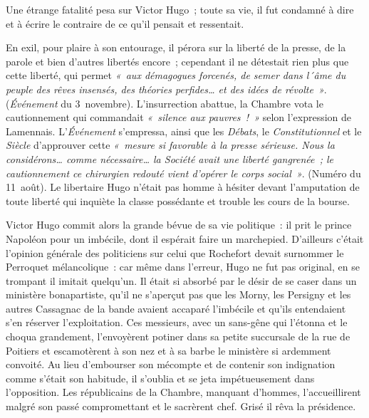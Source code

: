 \documentclass[french,twoside]{book} %
\begin{document}
Une étrange fatalité pesa sur Victor Hugo ; toute sa vie, il fut condamné à dire et à écrire le contraire de ce qu’il pensait et ressentait.\par
En exil, pour plaire à son entourage, il pérora sur la liberté de la presse, de la parole et bien d’autres  
\label{p32}libertés encore ; cependant il ne détestait rien plus que cette liberté, qui permet \emph{« aux démagogues forcenés, de semer dans l´âme du peuple des rêves insensés, des théories perfides… et des idées de révolte »}. (\emph{Événement} du 3 novembre). L’insurrection abattue, la Chambre vota le cautionnement qui commandait \emph{« silence aux pauvres ! »} selon l’expression de Lamennais. L’\emph{Événement} s’empressa, ainsi que les \emph{Débats}, le \emph{Constitutionnel} et le \emph{Siècle} d’approuver cette \emph{« mesure si favorable à la presse sérieuse. Nous la considérons… comme nécessaire… la Société avait une liberté gangrenée ; le cautionnement ce chirurgien redouté vient d’opérer le corps social »}. (Numéro du 11 août). Le libertaire Hugo n’était pas homme à hésiter devant l’amputation de toute liberté qui inquiète la classe possédante et trouble les cours de la bourse.\par
Victor Hugo commit alors la grande bévue de sa vie politique : il prit le prince Napoléon pour un imbécile, dont il espérait faire un marchepied. D’ailleurs c’était l’opinion générale des politiciens sur celui que Rochefort devait surnommer le Perroquet mélancolique : car même dans l’erreur, Hugo ne fut pas original, en se trompant il imitait quelqu’un. Il était si absorbé par le désir de se caser dans un ministère bonapartiste, qu’il ne s’aperçut pas que les Morny, les Persigny et les autres Cassagnac de la bande avaient accaparé l’imbécile et qu’ils entendaient s’en réserver l’exploitation. Ces messieurs, avec un sans-gêne qui l’étonna et le choqua grandement, l’envoyèrent potiner dans sa petite succursale de la rue de Poitiers et escamotèrent à son nez et à  
\label{p33}sa barbe le ministère si ardemment convoité. Au lieu d’embourser son mécompte et de contenir son indignation comme s’était son habitude, il s’oublia et se jeta impétueusement dans l’opposition. Les républicains de la Chambre, manquant d’hommes, l’accueillirent malgré son passé compromettant et le sacrèrent chef. Grisé il rêva la présidence.\par
\end{document}
